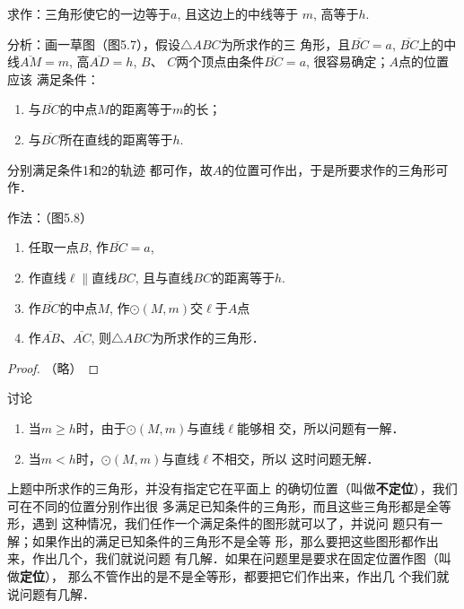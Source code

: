求作：三角形使它的一边等于$a$, 且这边上的中线等于
$m$, 高等于$h$.

分析：画一草图（图5.7），假设$\triangle ABC$为所求作的三
角形，且$\overline{BC}=a$, $\overline{BC}$上的中线$\overline{AM}=m$, 高$\overline{AD}=h$, $B$、
$C$两个顶点由条件$\overline{BC}=a$, 很容易确定；$A$点的位置应该
满足条件：
\begin{enumerate}
    \item 与$\overline{BC}$的中点$M$的距离等于$m$的长；
    \item 与$\overline{BC}$所在直线的距离等于$h$.
\end{enumerate}
分别满足条件1和2的轨迹
都可作，故$A$的位置可作出，于是所要求作的三角形可作．

作法：（图5.8）
\begin{figure}[htp]
    \centering
{}
    \caption{}
\end{figure}

\begin{enumerate}
    \item 任取一点$B$, 作$\overline{BC}=a$,
    \item 作直线$\ell\parallel$直线$BC$,
    且与直线$BC$的距离等于$h$.
    \item 作$\overline{BC}$的中点$M$, 作$\odot(M,m)$交$\ell$于$A$点
    \item  作$\overline{AB}$、$\overline{AC}$, 则$\triangle
    ABC$为所求作的三角形．
\end{enumerate}

\begin{proof}
    （略）
\end{proof}

讨论
\begin{enumerate}
    \item 当$m\ge h$时，由于$\odot(M,m)$与直线$\ell$能够相
交，所以问题有一解．
\item 当$m<h$时，$\odot(M,m)$与直线$\ell$不相交，所以
这时问题无解．
\end{enumerate}

\begin{rmk}
    上题中所求作的三角形，并没有指定它在平面上
    的确切位置（叫做\textbf{不定位}），我们可在不同的位置分别作出很
    多满足已知条件的三角形，而且这些三角形都是全等形，遇到
    这种情况，我们任作一个满足条件的图形就可以了，并说问
    题只有一解；如果作出的满足已知条件的三角形不是全等
    形，那么要把这些图形都作出来，作出几个，我们就说问题
    有几解．如果在问题里是要求在固定位置作图（叫做\textbf{定位}），
    那么不管作出的是不是全等形，都要把它们作出来，作出几
    个我们就说问题有几解． 
\end{rmk}


